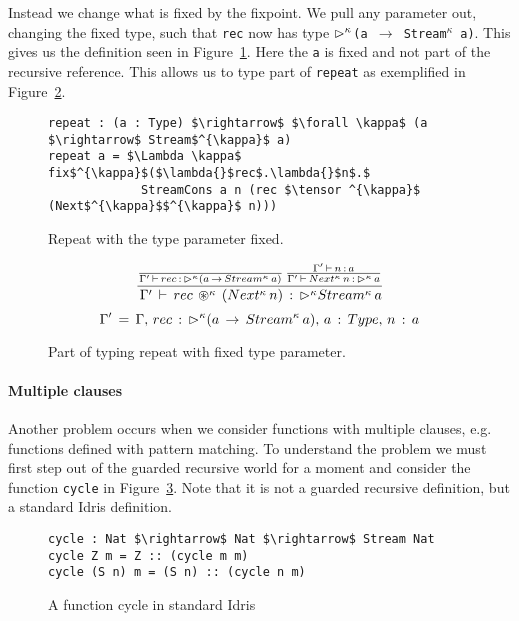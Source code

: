 Instead we change what is fixed by the fixpoint. We pull any parameter out,
changing the fixed type, such that \texttt{rec} now has type \texttt{$\rhd
  ^{\kappa}$(a $\rightarrow$ Stream$^{\kappa}$ a)}. This gives us the definition seen in
Figure~\ref{fig:repeat_guarded_example_new}. Here the \texttt{a} is fixed and
not part of the recursive reference. This allows us to type part of
\texttt{repeat} as exemplified in Figure~\ref{fig:repeat_typing_new}.

\begin{figure}[h]
  \begin{lstlisting}[mathescape]
repeat : (a : Type) $\rightarrow$ $\forall \kappa$ (a $\rightarrow$ Stream$^{\kappa}$ a)
repeat a = $\Lambda \kappa$ fix$^{\kappa}$($\lambda{}$rec$.\lambda{}$n$.$ 
             StreamCons a n (rec $\tensor ^{\kappa}$ (Next$^{\kappa}$$^{\kappa}$ n)))
\end{lstlisting}
  \caption{Repeat with the type parameter fixed.}
  \label{fig:repeat_guarded_example_new}
\end{figure}

\begin{figure}[h]
\[
\frac { \frac {  }{ \Gamma '\, \vdash \, rec\, :\, \rhd ^{\kappa}(a\, \rightarrow
    \, Stream^{\kappa}\, a) } \, \frac { \Gamma '\, \vdash \, n\, :\, a }{ \Gamma '\,
    \vdash \, Next^{\kappa}\, n\, :\, \rhd ^{\kappa}\, a }  }{ \, \Gamma '\, \vdash \, rec\,
  \circledast ^{\kappa} \, (Next^{\kappa}\, n)\, :\, \rhd ^{\kappa}Stream^{\kappa}\, a }
\]
\[
 \Gamma '\, =\, \Gamma ,\, rec\, :\, \rhd ^{\kappa}(a\, \rightarrow \, Stream^{\kappa}\,
 a),\, a\, :\, Type,\, n\, :\, a
\]

  \caption{Part of typing repeat with fixed type parameter.}
  \label{fig:repeat_typing_new}
\end{figure}

\paragraph{Multiple clauses}
Another problem occurs when we consider functions with multiple clauses,
e.g. functions defined with pattern matching. To understand the problem we must
first step out of the guarded recursive world for a moment and consider the
function \texttt{cycle} in Figure~\ref{fig:cycle_non_guarded}. Note that it is
not a guarded recursive definition, but a standard Idris definition.

\begin{figure}[h]
  \begin{lstlisting}[mathescape]
cycle : Nat $\rightarrow$ Nat $\rightarrow$ Stream Nat
cycle Z m = Z :: (cycle m m)
cycle (S n) m = (S n) :: (cycle n m)
\end{lstlisting}
  \caption{A function cycle in standard Idris}
  \label{fig:cycle_non_guarded}
\end{figure}

